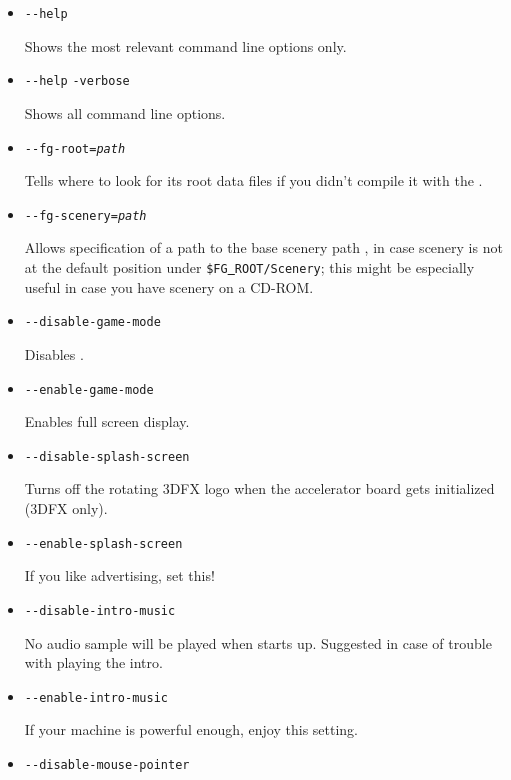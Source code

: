 \begin{itemize}
\item{\texttt{-$ $-help}}

  Shows the most relevant command line options only.

\item{\texttt{-$ $-help} \texttt{-verbose}}

  Shows all command line options.

\item{\texttt{-$ $-fg-root={\it path}}}

  Tells \FlightGear{} where to look for its root data files if you
  didn't compile it with the .

\item{\texttt{-$ $-fg-scenery={\it path}}}

  Allows specification of a path to the base scenery path
  , in case scenery is not at the default
  position under \texttt{\$FG\underline{~}ROOT/Scenery}; this might
  be especially useful in case you have scenery on a CD-ROM.

\item{\texttt{-$ $-disable-game-mode}}

  Disables .

\item{\texttt{-$ $-enable-game-mode}}

  Enables full screen display.

\item{\texttt{-$ $-disable-splash-screen}}

  Turns off the rotating 3DFX logo when the accelerator board gets
  initialized (3DFX only).

\item{\texttt{-$ $-enable-splash-screen}}

  If you like advertising, set this!

\item{\texttt{-$ $-disable-intro-music}}

  No audio sample will be played when \FlightGear{} starts up.
  Suggested in case of trouble with playing the intro.

\item{\texttt{-$ $-enable-intro-music}}

  If your machine is powerful enough, enjoy this setting.

\item{\texttt{-$ $-disable-mouse-pointer}}


\end{itemize}
